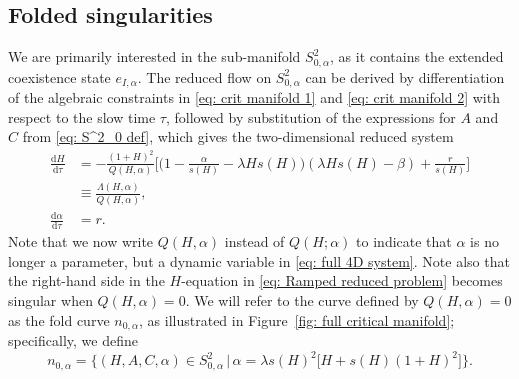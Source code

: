 \documentclass{article}
\theoremstyle{definition}
\numberwithin{equation}{section}
\newcommand{\dd}{\mathrm{d}}
\begin{document}
\subsection{Folded singularities}

We are primarily interested in the sub-manifold $S^2_{0,\alpha}$, as it contains the extended coexistence state $e_{I, \alpha}$. The reduced flow on $S_{0,\alpha}^2$ can be derived by differentiation of the algebraic constraints in \eqref{eq: crit manifold 1} and \eqref{eq: crit manifold 2} with respect to the slow time $\tau$, followed by substitution of the expressions for $A$ and $C$ from \eqref{eq: S^2_0 def}, which gives the two-dimensional reduced system
\begin{equation}
    \begin{aligned}
        \frac{\dd H}{\dd \tau} &= -\frac{(1+H)^2}{Q(H,\alpha)}\bigg[\bigg(1-\frac{\alpha}{s(H)}-\lambda H s(H)\bigg)(\lambda H s(H)-\beta)+\frac{r}{s(H)}\bigg]
    \\ 
    &\equiv \frac{\Lambda(H,\alpha)}{Q(H,\alpha)},\\
    \frac{\dd \alpha}{\dd \tau}&=r.
    \label{eq: Ramped reduced problem}
    \end{aligned}
\end{equation}
Note that we now write $Q(H,\alpha)$ instead of $Q(H;\alpha)$ to indicate that $\alpha$ is no longer a parameter, but a dynamic variable in \eqref{eq: full 4D system}. Note also that the right-hand side in the $H$-equation in \eqref{eq: Ramped reduced problem} becomes singular when $Q(H,\alpha)=0$. We will refer to the curve defined by $Q(H,\alpha)=0$ as the fold curve $n_{0,\alpha}$, as illustrated in Figure~\ref{fig: full critical manifold}; specifically, we define
\begin{equation}
    n_{0,\alpha} = \big\{(H,A,C,\alpha)\in S^2_{0,\alpha}\,\big|\, \alpha  = \lambda s(H)^2\big[H+s(H)(1+H)^2\big]\big\}.
    \label{eq: fold curve}
\end{equation}
\end{document}
